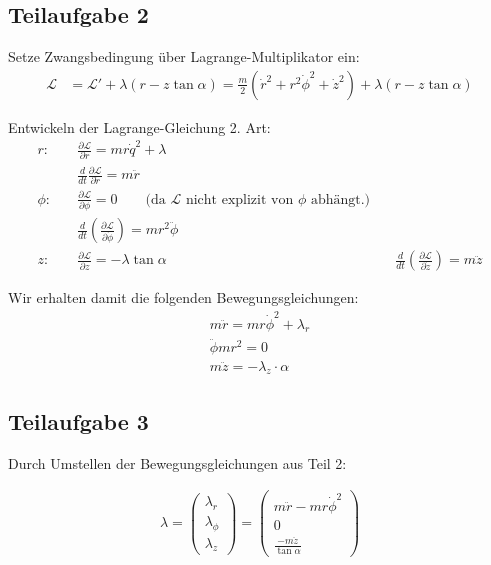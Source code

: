\documentclass[a4paper,german,12pt,smallheadings]{scrartcl}
\begin{document}
\subsection*{Teilaufgabe 2}
Setze Zwangsbedingung über Lagrange-Multiplikator ein:
\begin{align*}
\mathcal{L}&=\mathcal{L'} + \lambda(r-z \tan \alpha) = \frac{m}{2}(\dot{r}^2+r^2\dot{\phi}^2+\dot{z}^2) + \lambda(r-z \tan \alpha) 
\end{align*}

Entwickeln der Lagrange-Gleichung 2. Art:
\begin{align*}
r: & \quad \frac{\partial \mathcal{L}}{\partial r}=mr\dot{q}^2 + \lambda\\
& \quad \frac{d}{dt}\frac{\partial \mathcal{L}}{\partial \dot{r}}=m\ddot{r} \\
\phi: & \quad \frac{\partial \mathcal{L}}{\partial \phi} = 0 \qquad \text{(da $\mathcal{L}$ nicht explizit von $\phi$ abhängt.)}\\
& \quad \frac{d}{dt}\left(\frac{\partial \mathcal{L}}{\partial \dot{\phi}}\right)=mr^2\ddot{\phi} \\
z: & \quad \frac{\partial \mathcal{L}}{\partial z} = -\lambda \tan \alpha
& \quad \frac{d}{dt}\left(\frac{\partial \mathcal{L}}{\partial \dot{z}}\right)= m\ddot{z}
\end{align*}

Wir erhalten damit die folgenden Bewegungsgleichungen:
\begin{align*}
m\ddot{r} = mr\dot{\phi}^2 + \lambda_r \\
\ddot{\phi}mr^2 = 0 \\
m\ddot{z} = -\lambda_z \cdot \alpha
\end{align*}

\subsection*{Teilaufgabe 3}

Durch Umstellen der Bewegungsgleichungen aus Teil 2:

\begin{align*}
  \lambda = \begin{pmatrix} \lambda_r \\ \lambda_{\phi} \\ \lambda_z \end{pmatrix} = \begin{pmatrix} m\ddot{r} - mr\dot{\phi}^2 \\ 0 \\ \frac{-m\ddot{z}}{\tan \alpha} \end{pmatrix}
\end{align*}
\end{document}
